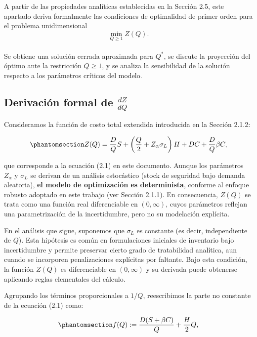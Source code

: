 \documentclass[
  spanish,
  us-letterpaper,
  DIV=11,
  numbers=noendperiod]{scrreprt}
\numberwithin{equation}{section}
\begin{document}
A partir de las propiedades analíticas establecidas en la Sección 2.5,
este apartado deriva formalmente las condiciones de optimalidad de
primer orden para el problema unidimensional\\
\[
\min_{Q \geq 1} Z(Q).
\]\\
Se obtiene una solución cerrada aproximada para \(Q^*\), se discute la
proyección del óptimo ante la restricción \(Q \geq 1\), y se analiza la
sensibilidad de la solución respecto a los parámetros críticos del
modelo.

\subsection{\texorpdfstring{Derivación formal de
\(\frac{dZ}{dQ}\)}{Derivación formal de \textbackslash frac\{dZ\}\{dQ\}}}\label{derivaciuxf3n-formal-de-fracdzdq}

Consideramos la función de costo total extendida introducida en la
Sección 2.1.2:

\begin{equation}\phantomsection\label{eq-ZQ_extendida}{
Z(Q) = \frac{D}{Q} S + \left( \frac{Q}{2} + Z_\alpha \sigma_L \right) H + D C + \frac{D}{Q} \beta C,
}\end{equation}

que corresponde a la ecuación (2.1) en este documento. Aunque los
parámetros \(Z_\alpha\) y \(\sigma_L\) se derivan de un análisis
estocástico (stock de seguridad bajo demanda aleatoria), \textbf{el
modelo de optimización es determinista}, conforme al enfoque robusto
adoptado en este trabajo (ver Sección 2.1.1). En consecuencia, \(Z(Q)\)
se trata como una función real diferenciable en \((0,\infty)\), cuyos
parámetros reflejan una parametrización de la incertidumbre, pero no su
modelación explícita.

En el análisis que sigue, suponemos que \(\sigma_L\) es constante (es
decir, independiente de \(Q\)). Esta hipótesis es común en formulaciones
iniciales de inventario bajo incertidumbre y permite preservar cierto
grado de tratabilidad analítica, aun cuando se incorporen penalizaciones
explícitas por faltante. Bajo esta condición, la función \(Z(Q)\) es
diferenciable en \((0, \infty)\) y su derivada puede obtenerse aplicando
reglas elementales del cálculo.

Agrupando los términos proporcionales a \(1/Q\), reescribimos la parte
no constante de la ecuación (2.1) como:

\begin{equation}\phantomsection\label{eq-fQ_no_constante}{
f(Q) := \frac{D(S + \beta C)}{Q} + \frac{H}{2} Q,
}\end{equation}
\end{document}
